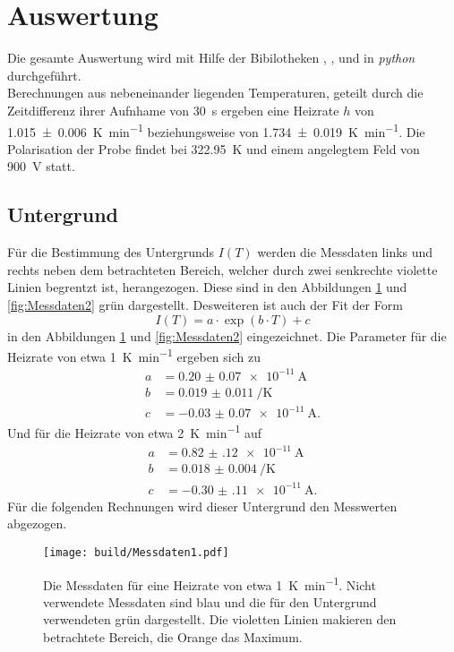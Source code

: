 \newpage
\section{Auswertung}
\label{sec:Auswertung}
Die gesamte Auswertung wird mit Hilfe der Bibilotheken \cite{matplotlib}, \cite{numpy}, \cite{scipy} und
\cite{uncertainties} in \textit{python} durchgeführt. \\
Berechnungen aus nebeneinander liegenden Temperaturen, geteilt durch die Zeitdifferenz ihrer Aufnhame von \SI{30}{\second}
ergeben eine Heizrate $h$ von \SI{1.015(6)}{\kelvin\per\minute} beziehungsweise von \SI{1.734(19)}{\kelvin\per\minute}.
Die Polarisation der Probe findet bei \SI{322.95}{\kelvin} und einem angelegtem Feld von \SI{900}{\volt} statt.

\subsection{Untergrund}
\label{sec:Unter}
Für die Bestimmung des Untergrunds $I(T)$ werden die Messdaten links und rechts neben dem betrachteten Bereich,
welcher durch zwei senkrechte violette Linien begrentzt ist, 
herangezogen. Diese sind in den Abbildungen \ref{fig:Messdaten1} und \ref{fig:Messdaten2} grün dargestellt.
Desweiteren ist auch der Fit der Form
\begin{equation}
    \label{eqn:exp}
    I(T) = a \cdot \exp \left(b\cdot T \right) + c
\end{equation}
in den Abbildungen \ref{fig:Messdaten1} und \ref{fig:Messdaten2} eingezeichnet.
Die Parameter für die Heizrate von etwa \SI{1}{\kelvin\per\minute} ergeben sich zu
\begin{align*}
    a &= \SI{0.20(7)e-11}{\ampere} \\
    b &= \SI{0.019(11)}{\per\kelvin} \\
    c &= \SI{-0.03(7)e-11}{\ampere}.
\end{align*}
Und für die Heizrate von etwa \SI{2}{\kelvin\per\minute} auf
\begin{align*}
    a &= \SI{0.82(12)e-11}{\ampere} \\
    b &= \SI{0.018(4)}{\per\kelvin} \\
    c &= \SI{-0.30(11)e-11}{\ampere}.
\end{align*}
Für die folgenden Rechnungen wird dieser Untergrund den Messwerten abgezogen.
\begin{figure}[htb]
  \centering
  \texttt{[image: build/Messdaten1.pdf]}
  \caption{Die Messdaten für eine Heizrate von etwa \SI{1}{\kelvin\per\minute}. Nicht verwendete Messdaten sind blau und die für den Untergrund verwendeten grün dargestellt. Die violetten Linien makieren den betrachtete Bereich, die Orange das Maximum.}
  \label{fig:Messdaten1}
\end{figure}
